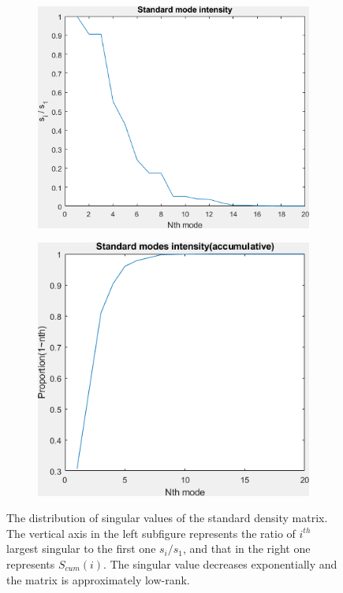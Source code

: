 \documentclass{article}
\numberwithin{equation}{section}
\begin{document}
 \begin{figure}
 \begin{subfigure}{.5\textwidth}
   \centering
   \includegraphics[width=0.9\linewidth]{figures/singular.png}  
   \label{fig:singular}
 \end{subfigure}
 \begin{subfigure}{.5\textwidth}
   \centering
   \includegraphics[width=.8\linewidth]{figures/singular_accumative.png}  
   \label{fig:singular_acc}
 \end{subfigure}
 \caption{The distribution of singular values of the standard density matrix. The vertical axis in the left subfigure represents the ratio of $i^{th}$ largest singular to the first one $s_i/s_1$, and that in the right one represents $S_{cum}(i)$. The singular value decreases exponentially and the matrix is approximately low-rank. }
 \label{fig:standard singular}
 \end{figure}
 
\end{document}
